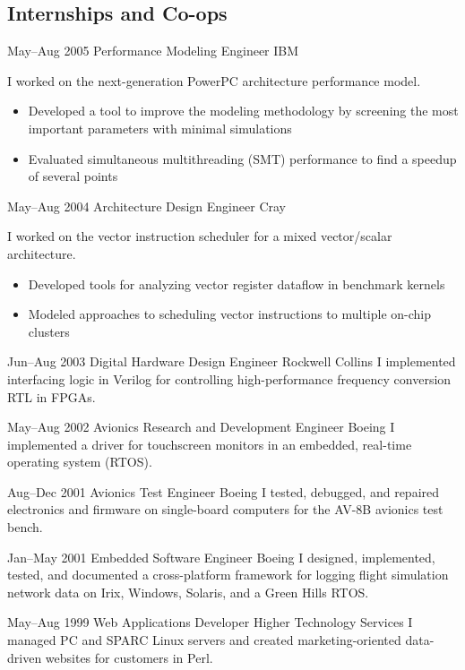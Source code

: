 \documentclass[11pt,a4paper,roman]{moderncv}
\begin{document}

\subsection{Internships and Co-ops}

\cventry%
{May--Aug 2005}%
{Performance Modeling Engineer}%
{IBM}%
{\austin}%
{}%
{I worked on the next-generation PowerPC architecture performance model.
\begin{itemize}
\item Developed a tool to improve the modeling methodology by screening the most important parameters with minimal simulations
\item Evaluated simultaneous multithreading (SMT) performance to find a speedup of several points
\end{itemize}}

\cventry%
{May--Aug 2004}%
{Architecture Design Engineer}%
{Cray}%
{\chippewafalls}%
{}%
{I worked on the vector instruction scheduler for a mixed vector/scalar architecture.
\begin{itemize}
\item Developed tools for analyzing vector register dataflow in benchmark kernels
\item Modeled approaches to scheduling vector instructions to multiple on-chip clusters
\end{itemize}}

\cventry%
{Jun--Aug 2003}%
{Digital Hardware Design Engineer}%
{Rockwell Collins}%
{\whitemarsh}%
{}%
{I implemented interfacing logic in Verilog for controlling high-performance frequency conversion RTL in FPGAs.}

\cventry%
{May--Aug 2002}%
{Avionics Research and Development Engineer}%
{Boeing}%
{\stlouis}%
{}%
{I implemented a driver for touchscreen monitors in an embedded, real-time operating system (RTOS).}

\cventry%
{Aug--Dec 2001}%
{Avionics Test Engineer}%
{Boeing}%
{\stlouis}%
{}%
{I tested, debugged, and repaired electronics and firmware on single-board computers for the AV-8B avionics test bench.}

\cventry%
{Jan--May 2001}%
{Embedded Software Engineer}%
{Boeing}%
{\stlouis}%
{}%
{I designed, implemented, tested, and documented a cross-platform \Cpp framework for logging flight simulation network data on Irix, Windows, Solaris, and a Green Hills RTOS.}

\cventry%
{May--Aug 1999}%
{Web Applications Developer}%
{Higher Technology Services}%
{\chattanooga}%
{}%
{I managed PC and SPARC Linux servers and created marketing-oriented data-driven websites for customers in Perl.}
\end{document}
